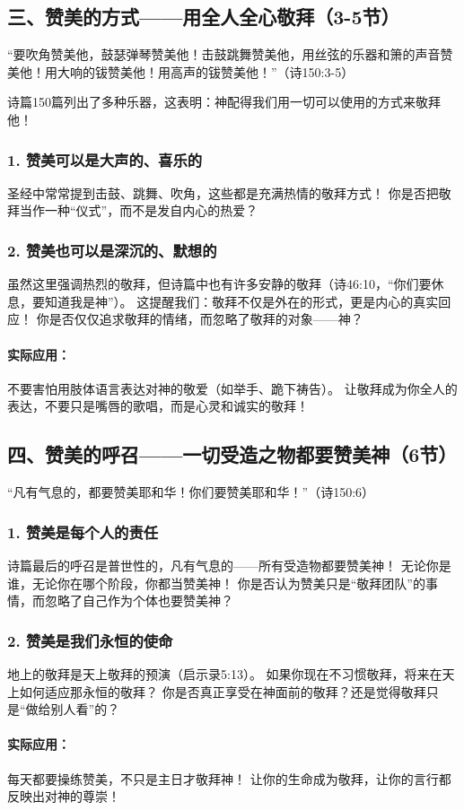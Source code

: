 \documentclass[a4paper, 12pt]{article}
\begin{document}
\subsection*{三、赞美的方式——用全人全心敬拜（3-5节）}
“要吹角赞美他，鼓瑟弹琴赞美他！击鼓跳舞赞美他，用丝弦的乐器和箫的声音赞美他！用大响的钹赞美他！用高声的钹赞美他！”（诗150:3-5）

诗篇150篇列出了多种乐器，这表明：神配得我们用一切可以使用的方式来敬拜他！

\subsubsection*{1. 赞美可以是大声的、喜乐的}
圣经中常常提到击鼓、跳舞、吹角，这些都是充满热情的敬拜方式！
你是否把敬拜当作一种“仪式”，而不是发自内心的热爱？
\subsubsection*{2. 赞美也可以是深沉的、默想的}
虽然这里强调热烈的敬拜，但诗篇中也有许多安静的敬拜（诗46:10，“你们要休息，要知道我是神”）。
这提醒我们：敬拜不仅是外在的形式，更是内心的真实回应！
你是否仅仅追求敬拜的情绪，而忽略了敬拜的对象——神？
\paragraph*{实际应用：}
不要害怕用肢体语言表达对神的敬爱（如举手、跪下祷告）。
让敬拜成为你全人的表达，不要只是嘴唇的歌唱，而是心灵和诚实的敬拜！
\subsection*{四、赞美的呼召——一切受造之物都要赞美神（6节）}
“凡有气息的，都要赞美耶和华！你们要赞美耶和华！”（诗150:6）

\subsubsection*{1. 赞美是每个人的责任}
诗篇最后的呼召是普世性的，凡有气息的——所有受造物都要赞美神！
无论你是谁，无论你在哪个阶段，你都当赞美神！
你是否认为赞美只是“敬拜团队”的事情，而忽略了自己作为个体也要赞美神？
\subsubsection*{2. 赞美是我们永恒的使命}
地上的敬拜是天上敬拜的预演（启示录5:13）。
如果你现在不习惯敬拜，将来在天上如何适应那永恒的敬拜？
你是否真正享受在神面前的敬拜？还是觉得敬拜只是“做给别人看”的？
\paragraph*{实际应用：}
每天都要操练赞美，不只是主日才敬拜神！
让你的生命成为敬拜，让你的言行都反映出对神的尊崇！
\end{document}
